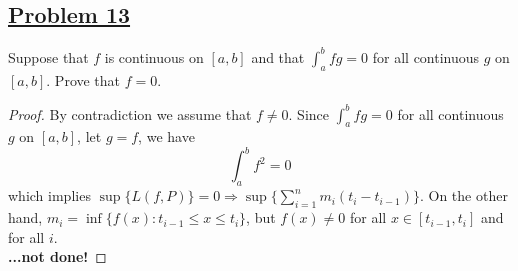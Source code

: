 \documentclass[10pt,letterpaper]{article}
\begin{document}
	\subsection*{{\color{purple}\underline{Problem 13}}}
	Suppose that $f$ is continuous on $[a, b]$ and that $\displaystyle\int_{a}^{b} fg = 0$
	for all continuous $g$ on $[a, b]$. Prove that $f = 0$.
	\begin{proof}
	By contradiction we assume that $f \neq 0$. Since $\displaystyle\int_{a}^{b} fg = 0$ for 
	all continuous $g$ on $[a, b]$, let $g = f$, we have
	$$\displaystyle\int_{a}^{b} f^2 = 0$$
	which implies $\sup\{L(f, P)\} = 0 \Rightarrow 
	\sup\bigg\{\displaystyle\sum_{i=1}^{n}m_i(t_i - t_{i-1})\bigg\}$. On the other hand,
	$m_i = \inf\{f(x): t_{i-1} \leq x \leq t_i\}$, but $f(x) \neq 0$ for all $x \in [t_{i-1}, t_i]$
	and for all $i$. \\
	
	\textbf{...not done!} 
	
	\end{proof}
	
	
\end{document}
